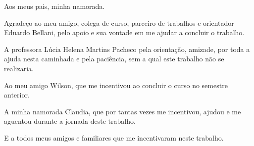 \documentclass[a4paper,12pt]{monografia}
\begin{document}
    

  \bacharelado {} 
  \data{\today} %

   
  
  
  
  
  
  
  
  \maketitle
  
  \begin{dedicatoria}
  Aos meus pais, minha namorada.\\
  \end{dedicatoria}
  

  \indent\indent Agradeço ao meu amigo, colega de curso, parceiro de trabalhos e orientador Eduardo Bellani, pelo apoio e sua vontade em me ajudar a concluir o trabalho.
  
  A professora Lúcia Helena Martins Pacheco pela orientação, amizade, por toda a ajuda nesta caminhada e pela paciência, sem a qual este trabalho não se realizaria.
  
  Ao meu amigo Wilson, que me incentivou ao concluir o curso no semestre anterior.
  
  A minha namorada Claudia, que por tantas vezes me incentivou, ajudou e me aguentou durante a jornada deste trabalho.
  
  E a todos meus amigos e familiares que me incentivaram neste trabalho.
  
  \newpage
  
  \tableofcontents
  
  \listoffigures
  
  \listoftables

    
    
    
    
    
    
    
    
    
    
    
    
    
  
  
  
\end{document}
